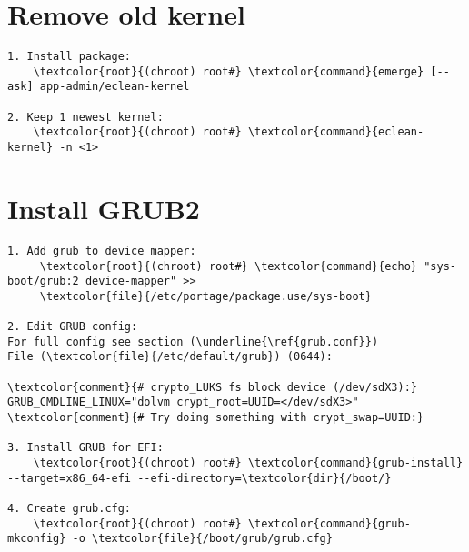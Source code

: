\documentclass[10pt, a4paper, onecolumn, openany]{book}         %
\begin{document}
\section{Remove old kernel}
\begin{Verbatim}[commandchars=\\\{\}]
1. Install package:
    \textcolor{root}{(chroot) root#} \textcolor{command}{emerge} [--ask] app-admin/eclean-kernel

2. Keep 1 newest kernel:
    \textcolor{root}{(chroot) root#} \textcolor{command}{eclean-kernel} -n <1>
\end{Verbatim}


\section{Install GRUB2}
\begin{Verbatim}[commandchars=\\\{\}]
1. Add grub to device mapper:
     \textcolor{root}{(chroot) root#} \textcolor{command}{echo} "sys-boot/grub:2 device-mapper" >>
     \textcolor{file}{/etc/portage/package.use/sys-boot}

2. Edit GRUB config:
For full config see section (\underline{\ref{grub.conf}})
File (\textcolor{file}{/etc/default/grub}) (0644):

\textcolor{comment}{# crypto_LUKS fs block device (/dev/sdX3):}
GRUB_CMDLINE_LINUX="dolvm crypt_root=UUID=</dev/sdX3>"
\textcolor{comment}{# Try doing something with crypt_swap=UUID:}

3. Install GRUB for EFI:
    \textcolor{root}{(chroot) root#} \textcolor{command}{grub-install} --target=x86_64-efi --efi-directory=\textcolor{dir}{/boot/}

4. Create grub.cfg:
    \textcolor{root}{(chroot) root#} \textcolor{command}{grub-mkconfig} -o \textcolor{file}{/boot/grub/grub.cfg}
\end{Verbatim}
\end{document}
